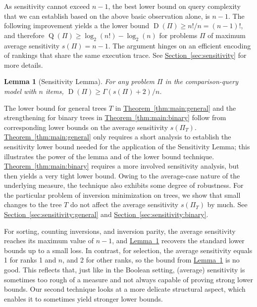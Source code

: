\documentclass[11pt]{article}
\numberwithin{equation}{section}
\newtheorem{lemma}[theorem]{Lemma}
\theoremstyle{definition}
\theoremstyle{plain}
\newcommand{\expref}[2]{\hyperref[#2]{#1~\ref{#2}}}
\DeclareMathOperator{\traces}{D}
\DeclareMathOperator{\DQ}{Q}
\begin{document}
As sensitivity cannot exceed $n-1$, the best lower bound on query complexity that we can establish based on the above basic observation alone, is $n-1$. The following improvement yields a the lower bound $\traces(\Pi) \ge n!/n = (n-1)!$, and therefore $\DQ(\Pi) \ge \log_2(n!) - \log_2(n)$ for problems $\Pi$ of maximum average sensitivity $s(\Pi)=n-1$. The argument hinges on an efficient encoding of rankings that share the same execution trace. See \expref{Section}{sec:sensitivity} for more details.

\begin{lemma}[Sensitivity Lemma]\label{lemma:sensitivity}
For any problem $\Pi$ in the comparison-query model with $n$ items, $\traces(\Pi) \ge \Gamma(s(\Pi)+2)/n$. 
\end{lemma}

The lower bound for general trees $T$ in \expref{Theorem}{thm:main:general} and the strengthening for binary trees in \expref{Theorem}{thm:main:binary} follow from corresponding lower bounds on the average sensitivity $s(\Pi_T)$. \expref{Theorem}{thm:main:general} only requires a short analysis to establish the sensitivity lower bound needed for the application of the Sensitivity Lemma; this illustrates the power of the lemma and of the lower bound technique. \expref{Theorem}{thm:main:binary} requires a more involved sensitivity analysis, but then yields a very tight lower bound. Owing to the average-case nature of the underlying measure, the technique also exhibits some degree of robustness. For the particular problem of inversion minimization on trees, we show that small changes to the tree $T$ do not affect the average sensitivity $s(\Pi_T)$ by much. See \expref{Section}{sec:sensitivity:general} and \expref{Section}{sec:sensitivity:binary}.

For sorting, counting inversions, and inversion parity, the average sensitivity reaches its maximum value of $n-1$, and \expref{Lemma}{lemma:sensitivity} recovers the standard lower bounds up to a small loss. In contrast, for selection, the average sensitivity equals 1 for ranks 1 and $n$, and 2 for other ranks, so the bound from \expref{Lemma}{lemma:sensitivity} is no good. This reflects that, just like in the Boolean setting, (average) sensitivity is sometimes too rough of a measure and not always capable of proving strong lower bounds. Our second technique looks at a more delicate structural aspect, which enables it to sometimes yield stronger lower bounds. 
\end{document}
